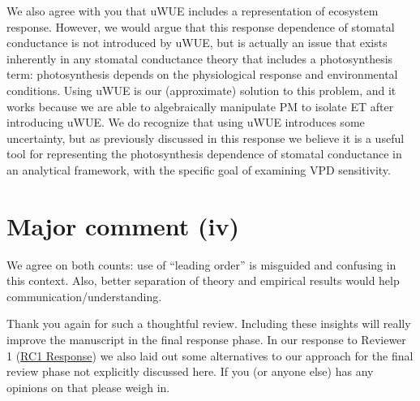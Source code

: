 \documentclass[12pt]{article}
\begin{document}
We also agree with you that uWUE includes a representation of
ecosystem response. However, we would argue that this response
dependence of stomatal conductance is not introduced by uWUE, but is
actually an issue that exists inherently in any stomatal conductance
theory that includes a photosynthesis term: photosynthesis depends on
the physiological response and environmental conditions. Using uWUE is
our (approximate) solution to this problem, and it works because we
are able to algebraically manipulate PM to isolate ET after
introducing uWUE. We do recognize that using uWUE introduces some
uncertainty, but as previously discussed in this response we believe
it is a useful tool for representing the photosynthesis dependence of
stomatal conductance in an analytical framework, with the specific
goal of examining VPD sensitivity.

\section{Major comment (iv)}

We agree on both counts: use of ``leading order'' is misguided and
confusing in this context. Also, better separation of theory and
empirical results would help communication/understanding.
\vspace{0.3in}

Thank you again for such a thoughtful review. Including these insights
will really improve the manuscript in the final response phase. In our
response to Reviewer 1
(\href{https://editor.copernicus.org/index.php/hess-2018-553-AC1.pdf?_mdl=msover_md&_jrl=13&_lcm=oc108lcm109w&_acm=get_comm_file&_ms=72556&c=153745&salt=1660920846993335212}{RC1
Response})
we also laid out some alternatives to our approach for the final
review phase not explicitly discussed here. If you (or anyone else)
has any opinions on that please weigh in.


\end{document}
